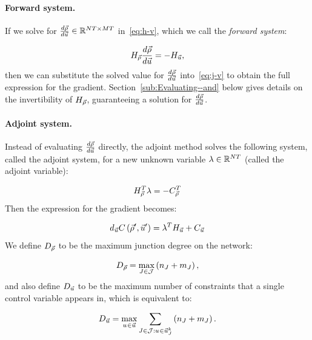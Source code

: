 \paragraph{Forward system.\label{par:Forward-system}}

If we solve for $\frac{d\vec{\rho}}{d\vec{u}}\in\mathbb{R}^{NT\times MT}$
in~\eqref{eq:h-v}, which we call the \emph{forward system}:

\[
	H_{\vec{\rho}}\frac{d\vec{\rho}}{d\vec{u}}=-H_{\vec{u}},
\]
then we can substitute the solved value for $\frac{d\vec{\rho}}{d\vec{u}}$
into~\eqref{eq:j-v} to obtain the full expression for the gradient.
Section~\ref{sub:Evaluating--and} below gives details on the invertibility
of $H_{\vec{\rho}}$, guaranteeing a solution for $\frac{d\vec{\rho}}{d\vec{u}}$.


\paragraph{Adjoint system.\label{par:Adjoint-system}}

Instead of evaluating $\frac{d\vec{\rho}}{d\vec{u}}$ directly, the adjoint
method solves the following system, called the adjoint system,
for a new unknown variable $\lambda\in\mathbb{R}^{NT}$
(called the adjoint variable):

\begin{equation}
	H_{\vec{\rho}}^{T}\lambda=-C_{\vec{\rho}}^{T}\label{eq:adjoint}
\end{equation}
Then the expression for the gradient becomes:

\begin{equation}
	d_{\vec{u}}C\left(\vec{\rho}',\vec{u}'\right)=\lambda^{T}H_{\vec{u}}+C_{\vec{u}}\label{eq:adjoint-grad}
\end{equation}
We define $D_{\vec{\rho}}$ to be the maximum junction degree on
the network:

\begin{equation}
	D_{\vec{\rho}}=\max_{J\in\mathcal{J}}\left(n_{J}+m_{J}\right),\label{eq:dx}
\end{equation}
and also define $D_{\vec{u}}$ to be the maximum number of constraints
that a single control variable appears in, which is equivalent to:

\begin{equation}
	D_{\vec{u}}=\max_{u_{}^{}\in\vec{u}}\sum_{J\in\mathcal{J}:u_{}^{}\in\vec{u}_{J}^{k}}\left(n_{J}+m_{J}\right)\label{eq:dv}.
\end{equation}


